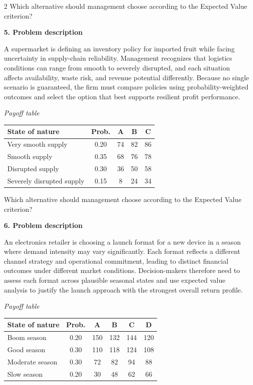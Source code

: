 \documentclass[12pt]{article}
\newcommand{\SubsectionBox}[1]{%
	\noindent\colorbox{gray!30}{%
		\parbox{\linewidth}{\textbf{#1}}%
	}\par\vspace{0.35cm}%
}
\begin{document}
\begin{multicols}{2}
				Which alternative should management choose according to the Expected Value criterion?

		\vspace{0.25cm}
		\SubsectionBox{5. Problem description}\vspace{-0.25cm}
		A supermarket is defining an inventory policy for imported fruit while facing uncertainty in supply-chain reliability. Management recognizes that logistics conditions can range from smooth to severely disrupted, and each situation affects availability, waste risk, and revenue potential differently. Because no single scenario is guaranteed, the firm must compare policies using probability-weighted outcomes and select the option that best supports resilient profit performance.
		
				\begin{center}
					\textit{Payoff table} \par
					\begin{tabular}{l c c c c}
						\toprule
						State of nature & Prob. &  A & B & C \\
						\midrule
						Very smooth supply & 0.20 & 74 & 82 & 86 \\
						Smooth supply & 0.35 & 68 & 76 & 78 \\
						Disrupted supply & 0.30 & 36 & 50 & 58 \\
						Severely disrupted supply & 0.15 & 8 & 24 & 34 \\
						\bottomrule
					\end{tabular}
				\end{center}
		
				Which alternative should management choose according to the Expected Value criterion?

		\vspace{0.25cm}
		\SubsectionBox{6. Problem description}\vspace{-0.25cm}
		An electronics retailer is choosing a launch format for a new device in a season where demand intensity may vary significantly. Each format reflects a different channel strategy and operational commitment, leading to distinct financial outcomes under different market conditions. Decision-makers therefore need to assess each format across plausible seasonal states and use expected value analysis to justify the launch approach with the strongest overall return profile.
		
				\begin{center}
					\textit{Payoff table} \par
					\begin{tabular}{l c c c c c}
						\toprule
						State of nature & Prob. & A & B & C & D \\
						\midrule
						Boom season & 0.20 & 150 & 132 & 144 & 120 \\
						Good season & 0.30 & 110 & 118 & 124 & 108 \\
						Moderate season & 0.30 & 72 & 82 & 94 & 88 \\
						Slow season & 0.20 & 30 & 48 & 62 & 66 \\
						\bottomrule
					\end{tabular}
				\end{center}
		

\end{multicols}
\end{document}

